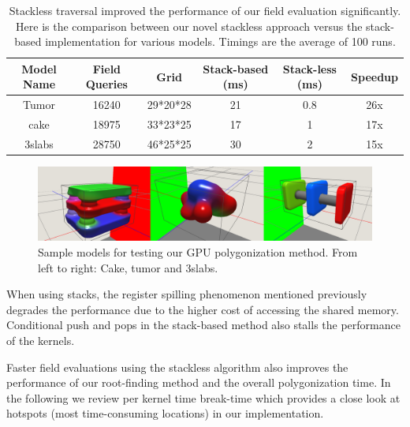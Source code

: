 \begin{table}[H]
\begin{center}
	 \caption{\label{table:stackless}
  {Stackless \blob traversal improved the performance of our \blob field evaluation significantly.
  Here is the comparison between our novel stackless approach versus the stack-based implementation for various models. 
  Timings are the average of 100 runs.}
}
  \begin{tabular}{ | c | c | c | c | c | c |}
    \hline    
    Model Name & Field Queries & Grid & Stack-based (ms) & Stack-less (ms) & Speedup \\ \hline \hline
    Tumor & 16240 & 29*20*28 & 21 & 0.8 & 26x\\ \hline
    cake & 18975 & 33*23*25 & 17 & 1 & 17x\\ \hline
    3slabs & 28750 & 46*25*25 & 30 & 2 & 15x \\ \hline
    \hline
  \end{tabular}
\end{center}
\end{table}


\begin{figure}[H]
  \centering
  \includegraphics[width=1.0\linewidth]{figures/gpupoly/combined_models.png}
  \caption{\label{fig:combinedmodels}
  {Sample models for testing our GPU polygonization method. From left to right: Cake, tumor and 3slabs.}
}
\end{figure}

When using stacks, the register spilling phenomenon mentioned previously degrades the performance due to the higher cost of accessing 
the shared memory. Conditional push and pops in the stack-based method also stalls the performance of the kernels.  

Faster field evaluations using the stackless algorithm also improves the performance of our root-finding method and the overall
polygonization time. In the following we review per kernel time break-time which provides a close look at hotspots (most time-consuming 
locations) in our implementation. 

